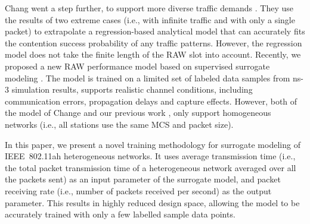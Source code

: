 Chang  went a step further, to support more diverse traffic demands \cite{Chang2018}. They use the results of two extreme cases (i.e., with infinite traffic and with only a single packet) to extrapolate a regression-based analytical model that can accurately fits the contention success probability of any traffic patterns. However, the regression model does not take the finite length of the RAW slot into account.
 Recently, we proposed a new RAW performance model based on supervised surrogate modeling \cite{wowmom2018}. The model is trained on a limited set of labeled data samples from ns-3 simulation results, supports realistic channel conditions, including communication errors, propagation delays and capture effects. However, both of the model of Change \cite{Chang2018} and our previous work \cite{wowmom2018}, only support homogeneous networks (i.e., all stations use the same MCS and packet size). 
 
 
 
In this paper, we present a novel training methodology for surrogate modeling of IEEE~802.11ah heterogeneous networks. It uses average transmission time (i.e., the total packet transmission time of a heterogeneous network averaged over all the packets sent) as an input parameter of the surrogate model, and packet receiving rate (i.e., number of packets received per second) as the output parameter. This results in highly reduced design space, allowing the model to be accurately trained with only a few labelled sample data points. 







